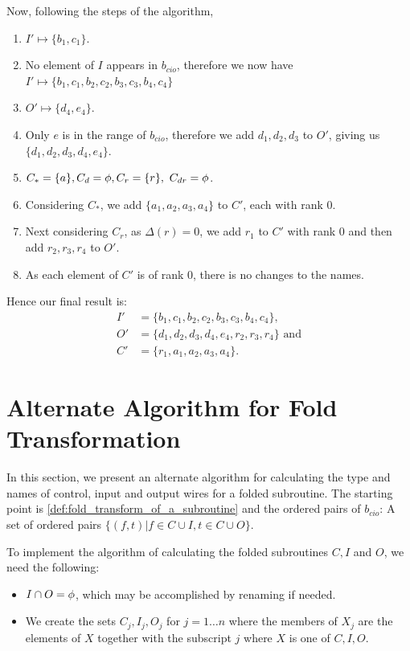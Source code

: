 Now, following the steps of the algorithm,
\begin{enumerate}
  \item $I' \mapsto \{b_1,c_1\}$.
  \item No element of $I$ appears in $b_{cio}$, therefore we now have
    $I' \mapsto \{b_1,c_1,b_2,c_2,b_3,c_3,b_4,c_4\}$
  \item $O' \mapsto \{d_4,e_4\}$.
  \item Only $e$ is in the range of $b_{cio}$, therefore we add
  $d_1,d_2,d_3$ to  $O'$, giving us $\{d_1,d_2,d_3,d_4,e_4\}$.
  \item $C_*=\{a\},C_d=\nothing, C_r = \{r\},\ C_{dr}=\nothing$.
  \item Considering $C_*$, we add $\{a_1,a_2,a_3,a_4\}$ to $C'$, each with
    rank 0.
  \item Next considering $C_r$, as $\Delta(r)=0$, we add $r_1$ to $C'$ with
    rank 0 and then add $r_2,r_3,r_4$ to $O'$.
  \item As each element of $C'$ is of rank 0, there is no changes
    to the names.
\end{enumerate}

Hence our final result is:
\begin{align*}
  I'&=\{b_1,c_1,b_2,c_2,b_3,c_3,b_4,c_4\},\\
  O'&=\{d_1,d_2,d_3,d_4,e_4,r_2,r_3,r_4\}\text{ and}\\
  C'&=\{r_1,a_1,a_2,a_3,a_4\}.
\end{align*}


\section{Alternate Algorithm for Fold Transformation} %
\label{sec:alternate_algorithm_for_fold_transformation}
In  this section, we present an alternate algorithm for calculating the
type and names of control, input and output wires for a folded
subroutine.  The starting point is 
\vref{def:fold_transform_of_a_subroutine}
and the ordered pairs of $b_{cio}$: A set of ordered pairs
$\{(f,t)|f\in C\cup I, t \in C\cup O\}$.

To implement the algorithm of calculating the folded subroutines $C,I$ and
$O$, we need the following:
\begin{itemize}
  \item $I\cap O = \phi$, which may be accomplished by renaming if needed.
  \item We create the sets $C_j,I_j,O_j$ for $j=1\ldots n$ where the members
    of $X_j$ are the elements of $X$ together with the subscript $j$ where
    $X$ is one of $C,I,O$.
\end{itemize}

